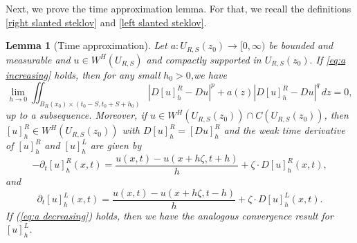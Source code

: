 \documentclass[10pt,a4paper]{amsart}
\newtheorem{lemma}[theorem]{Lemma}
\numberwithin{equation}{section}
\begin{document}
Next, we prove the time approximation lemma. For that, we recall the definitions \eqref{right slanted steklov} and \eqref{left slanted steklov}.
\begin{lemma}[Time approximation]\label{lem:steklov lemma}
Let $a:U_{R, S}(z_0) \rightarrow [0,\infty)$ be bounded and measurable and $u \in W^H(U_{R, S})$ and compactly supported in $U_{R, S}(z_0).$ If \eqref{eq:a increasing} holds, then for any small $h_{0}>0$,we have
\[
\lim_{h\rightarrow0}\iint_{B_{R}(x_0)\times (t_0-S, t_0+S+h_0)}\left|D[u]^R_h-Du \right|^p+a(z)\left|D[u]^R_h-Du\right|^{q} \, dz =0,
\] up to a subsequence.
Moreover, if $u\in W^{H}(U_{R, S}(z_0))\cap C(U_{R, S}(z_0))$, then $[u]_{h}^{R}\in W^{H}(U_{R, S}(z_0))$
with $D[u]_{h}^{R}=[Du]_{h}^{R}$ and the weak time
derivative of $[u]_{h}^{R}$ and $[u]^L_{h}$ are given by
\[
-\partial_{t}[u]_{h}^{R}(x,t)=\frac{u(x, t)-u(x+h\zeta,t+h)}{h}+\zeta\cdot D[u]_{h}^{R}(x,t),
\]
and
\[\partial_{t}[u]_{h}^{L}(x,t)=\frac{u(x, t)-u(x+h\zeta,t-h)}{h}+\zeta\cdot D[u]_{h}^{L}(x,t).\]
If (\ref{eq:a decreasing}) holds, then we have the analogous convergence result for $[u]^{L}_h$.
\end{lemma}
\end{document}
